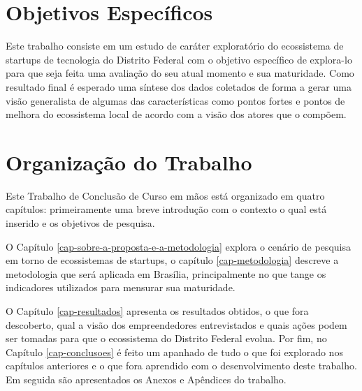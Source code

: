 \section{Objetivos Específicos}
\label{section:objetivos_especificos}

Este trabalho consiste em um estudo de caráter exploratório do ecossistema de startups de tecnologia do Distrito Federal com o objetivo específico de explora-lo para que seja feita uma avaliação do seu atual momento e sua maturidade. Como resultado final é esperado uma síntese dos dados coletados de forma a gerar uma visão generalista de algumas das características como pontos fortes e pontos de melhora do ecossistema local de acordo com a visão dos atores que o compõem. 

\section{Organização do Trabalho}
\label{section:organizacao_do_trabalho}

Este Trabalho de Conclusão de Curso em mãos está organizado em quatro capítulos: primeiramente uma breve introdução com o contexto o qual está inserido e os objetivos de pesquisa.

O Capítulo \ref{cap-sobre-a-proposta-e-a-metodologia} explora o cenário de pesquisa em torno de ecossistemas de startups, o capítulo \ref{cap-metodologia} descreve a metodologia que será aplicada em Brasília, principalmente no que tange os indicadores utilizados para mensurar sua maturidade.

O Capítulo \ref{cap-resultados} apresenta os resultados obtidos, o que fora descoberto, qual a visão dos empreendedores entrevistados e quais ações podem ser tomadas para que o ecossistema do Distrito Federal evolua. Por fim, no Capítulo \ref{cap-conclusoes} é feito um apanhado de tudo o que foi explorado nos capítulos anteriores e o que fora aprendido com o desenvolvimento deste trabalho. Em seguida são apresentados os Anexos e Apêndices do trabalho.

